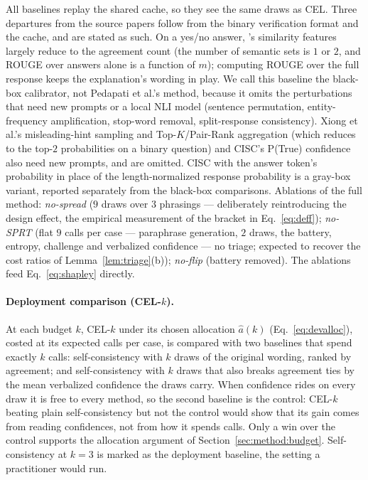 \documentclass[11pt]{article}
\begin{document}
All baselines replay the shared cache, so they see the same draws as
CEL. Three departures from the source papers follow from the binary
verification format and the cache, and are stated as such.
On a yes/no answer, \citeauthor{pedapati2024}'s similarity features
largely reduce to the agreement count (the number of semantic sets is
$1$ or $2$, and ROUGE over answers alone is a function of $m$); computing
ROUGE over the full response keeps the explanation's wording in play.
We call this baseline the black-box calibrator, not Pedapati et al.'s method, because it omits the
perturbations that need new prompts or a local NLI model (sentence
permutation, entity-frequency amplification, stop-word removal,
split-response consistency). Xiong et al.'s misleading-hint sampling and
Top-$K$/Pair-Rank aggregation (which reduces to the top-$2$
probabilities on a binary question) and CISC's P(True) confidence
also need new prompts, and are omitted. CISC with the answer token's
probability in place of the length-normalized response probability is
a gray-box variant, reported separately from the black-box comparisons.
Ablations of the full method: \emph{no-spread} ($9$ draws over $3$
phrasings --- deliberately reintroducing the design effect, the
empirical measurement of the bracket in Eq.~\eqref{eq:deff});
\emph{no-SPRT} (flat $9$ calls per case --- paraphrase generation, $2$
draws, the battery, entropy, challenge and verbalized confidence ---
no triage; expected to
recover the cost ratios of Lemma~\ref{lem:triage}(b)); \emph{no-flip}
(battery removed). The ablations feed Eq.~\eqref{eq:shapley} directly.

\paragraph{Deployment comparison (CEL-$k$).} At each budget $k$,
CEL-$k$ under its chosen allocation $\hat a(k)$
(Eq.~\eqref{eq:devalloc}), costed at its expected calls per case, is
compared with two baselines that spend exactly $k$ calls:
self-consistency with $k$ draws of the original wording, ranked by
agreement; and self-consistency with $k$ draws that also breaks
agreement ties by the mean verbalized confidence the draws carry. When
confidence rides on every draw it is free to every method, so the
second baseline is the control: CEL-$k$ beating plain self-consistency
but not the control would show that its gain comes from reading
confidences, not from how it spends calls. Only a win over the control
supports the allocation argument of Section~\ref{sec:method:budget}.
Self-consistency at $k = 3$ is marked as the deployment baseline, the
setting a practitioner would run.
\end{document}
